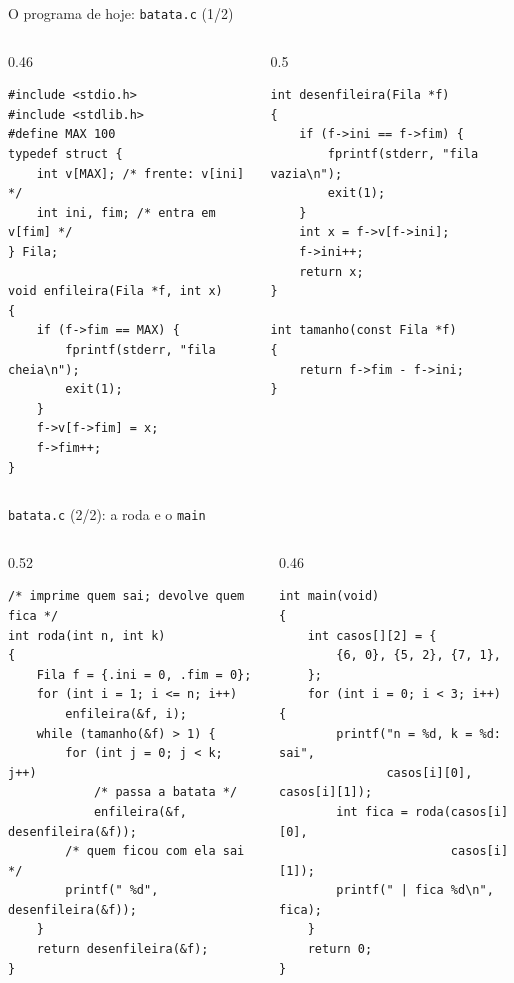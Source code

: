 \documentclass[aspectratio=169]{beamer}
\begin{document}
\begin{frame}[fragile]{O programa de hoje: \texttt{batata.c} (1/2)}
  \begin{columns}[T]
    \begin{column}{0.46\textwidth}
\begin{lstlisting}[style=codC]
#include <stdio.h>
#include <stdlib.h>
#define MAX 100
typedef struct {
    int v[MAX]; /* frente: v[ini] */
    int ini, fim; /* entra em v[fim] */
} Fila;

void enfileira(Fila *f, int x)
{
    if (f->fim == MAX) {
        fprintf(stderr, "fila cheia\n");
        exit(1);
    }
    f->v[f->fim] = x;
    f->fim++;
}
\end{lstlisting}
    \end{column}
    \begin{column}{0.5\textwidth}
\begin{lstlisting}[style=codC]
int desenfileira(Fila *f)
{
    if (f->ini == f->fim) {
        fprintf(stderr, "fila vazia\n");
        exit(1);
    }
    int x = f->v[f->ini];
    f->ini++;
    return x;
}

int tamanho(const Fila *f)
{
    return f->fim - f->ini;
}
\end{lstlisting}
    \end{column}
  \end{columns}
\end{frame}

\begin{frame}[fragile]{\texttt{batata.c} (2/2): a roda e o \texttt{main}}
  \vspace{-0.4em}
  \begin{columns}[T]
    \begin{column}{0.52\textwidth}
\begin{lstlisting}[style=codC]
/* imprime quem sai; devolve quem fica */
int roda(int n, int k)
{
    Fila f = {.ini = 0, .fim = 0};
    for (int i = 1; i <= n; i++)
        enfileira(&f, i);
    while (tamanho(&f) > 1) {
        for (int j = 0; j < k; j++)
            /* passa a batata */
            enfileira(&f, desenfileira(&f));
        /* quem ficou com ela sai */
        printf(" %d", desenfileira(&f));
    }
    return desenfileira(&f);
}
\end{lstlisting}
    \end{column}
    \begin{column}{0.46\textwidth}
\begin{lstlisting}[style=codC]
int main(void)
{
    int casos[][2] = {
        {6, 0}, {5, 2}, {7, 1},
    };
    for (int i = 0; i < 3; i++) {
        printf("n = %d, k = %d: sai",
               casos[i][0], casos[i][1]);
        int fica = roda(casos[i][0],
                        casos[i][1]);
        printf(" | fica %d\n", fica);
    }
    return 0;
}
\end{lstlisting}
    \end{column}
  \end{columns}
\end{frame}
\end{document}
